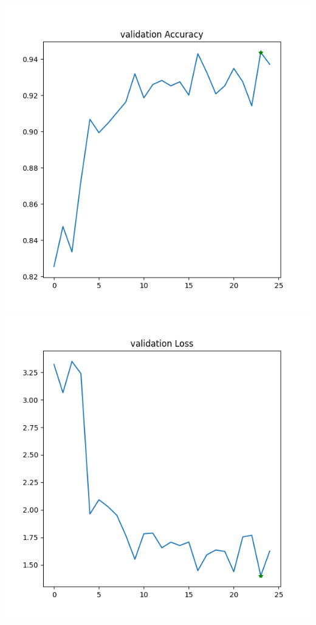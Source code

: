 \begin{enumerate}
    \includegraphics[scale=0.5]{images/report/FaceMask-validation-accuracy}
    \includegraphics[scale=0.5]{images/report/FaceMask-validation-loss}


\end{enumerate}
